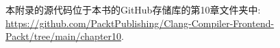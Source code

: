 本附录的源代码位于本书的GitHub存储库的第10章文件夹中: \url{https://github.com/PacktPublishing/Clang-Compiler-Frontend-Packt/tree/main/chapter10}.
